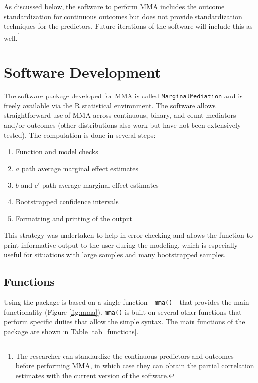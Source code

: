 \documentclass[]{DissertateUSU}
\providecommand{\tightlist}{%
  \setlength{\itemsep}{0pt}\setlength{\parskip}{0pt}}
\let\rmarkdownfootnote\footnote%
\def\footnote{\protect\rmarkdownfootnote}
\begin{document}
As discussed below, the software to perform MMA includes the outcome
standardization for continuous outcomes but does not provide
standardization techniques for the predictors. Future iterations of the
software will include this as
well.\footnote{The researcher can standardize the continuous predictors and outcomes before performing MMA, in which case they can obtain the partial correlation estimates with the current version of the software.}

\section{Software Development}\label{software-development-1}

The software package developed for MMA is called
\texttt{MarginalMediation} and is freely available via the R statistical
environment. The software allows straightforward use of MMA across
continuous, binary, and count mediators and/or outcomes (other
distributions also work but have not been extensively tested). The
computation is done in several steps:

\begin{enumerate}
\def\labelenumi{\arabic{enumi}.}
\tightlist
\item
  Function and model checks
\item
  \(a\) path average marginal effect estimates
\item
  \(b\) and \(c'\) path average marginal effect estimates
\item
  Bootstrapped confidence intervals
\item
  Formatting and printing of the output
\end{enumerate}

This strategy was undertaken to help in error-checking and allows the
function to print informative output to the user during the modeling,
which is especially useful for situations with large samples and many
bootstrapped samples.

\subsection{Functions}\label{functions}

Using the package is based on a single function---\texttt{mma()}---that
provides the main functionality (Figure \ref{fig:mma}). \texttt{mma()}
is built on several other functions that perform specific duties that
allow the simple syntax. The main functions of the package are shown in
Table \ref{tab_functions}.
\end{document}
